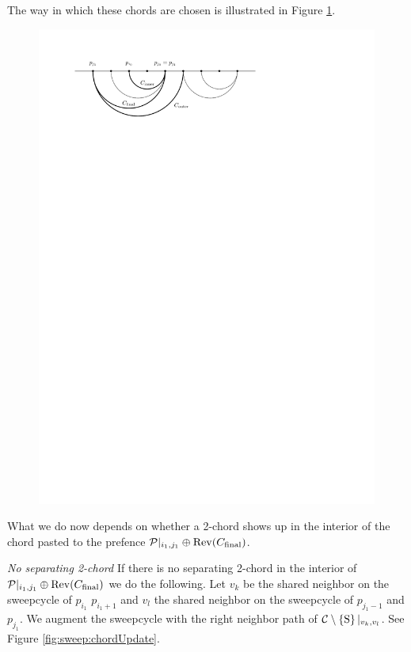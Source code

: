     The way in which these chords are chosen is illustrated in Figure \ref{fig:sweep:chordsOnPrefence}.

    \begin{figure}[h]
      \centering
      \includegraphics[scale=1]{unifiedalgo/img/sweep/chordsOnPrefence}
      \caption{}
      \label{fig:sweep:chordsOnPrefence}
    \end{figure}

    What we do now depends on whether a 2-chord shows up in the interior of the chord pasted to the prefence $\mathcal{P}|_{i_1, j_1} \oplus \operatorname{Rev}({C_\text{final}})$.


    \emph{No separating 2-chord}
    If there is no separating 2-chord in the interior of $\mathcal{P}|_{i_1, j_1} \oplus \operatorname{Rev}({C_\text{final}})$ we do the following. Let $v_k$ be the shared neighbor on the sweepcycle of $p_{i_1}$ $p_{i_1 +1}$ and $v_l$ the shared neighbor on the sweepcycle  of $p_{j_1 -1}$ and $p_{j_1}$. We augment the sweepcycle with the right neighbor path of $\mathcal{C} \setminus \left\lbrace {\mathrm{S}} \right\rbrace|_{v_k, v_l}$. See Figure \ref{fig:sweep:chordUpdate}.

